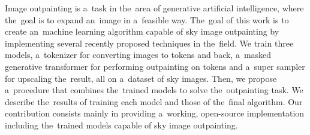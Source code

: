 \documentclass[12pt]{report}
\begin{document}

Image outpainting is a~task in the~area of generative artificial intelligence, where the~goal is to expand an~image in a~feasible way. The~goal of this work is to create an~machine learning algorithm capable of sky image outpainting by implementing several recently proposed techniques in the~field. We train three models, a~tokenizer for converting images to tokens and back, a~masked generative transformer for performing outpainting on tokens and a~super sampler for upscaling the~result, all on a~dataset of sky images. Then, we propose a~procedure that combines the~trained models to solve the~outpainting task. We describe the~results of training each model and those of the~final algorithm. Our contribution consists mainly in providing a~working, open-source implementation including the~trained models capable of sky image outpainting.
\end{document}

